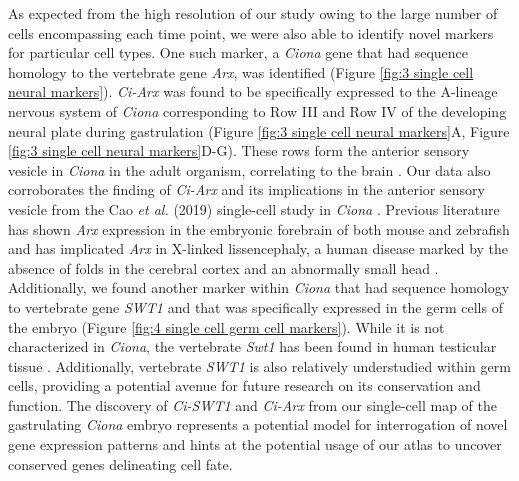 As expected from the high resolution of our study owing to the large number of cells encompassing each time point, we were also able to identify novel markers for particular cell types. One such marker, a \textit{Ciona} gene that had sequence homology to the vertebrate gene \textit{Arx}, was identified (Figure \ref{fig:3 single cell neural markers}). \textit{Ci-Arx} was found to be specifically expressed to the A-lineage nervous system of \textit{Ciona} corresponding to Row III and Row IV of the developing neural plate during gastrulation (Figure \ref{fig:3 single cell neural markers}A, Figure \ref{fig:3 single cell neural markers}D-G). These rows form the anterior sensory vesicle in \textit{Ciona} in the adult organism, correlating to the brain \cite{satoh2014}. Our data also corroborates the finding of \textit{Ci-Arx} and its implications in the anterior sensory vesicle from the Cao \textit{et al.} (2019) single-cell study in \textit{Ciona} \cite{cao2019}. Previous literature has shown \textit{Arx} expression in the embryonic forebrain of both mouse and zebrafish and has implicated \textit{Arx} in X-linked lissencephaly, a human disease marked by the absence of folds in the cerebral cortex and an abnormally small head \cite{miura1997,miura1997,kitamura2002,lim2019,fulp2008}. Additionally, we found another marker within \textit{Ciona} that had sequence homology to vertebrate gene \textit{SWT1} and that was specifically expressed in the germ cells of the embryo (Figure \ref{fig:4 single cell germ cell markers}). While it is not characterized in \textit{Ciona}, the vertebrate \textit{Swt1} has been found in human testicular tissue \cite{fagerberg2014}. Additionally, vertebrate \textit{SWT1} is also relatively understudied within germ cells, providing a potential avenue for future research on its conservation and function. The discovery of \textit{Ci-SWT1} and \textit{Ci-Arx} from our single-cell map of the gastrulating \textit{Ciona} embryo represents a potential model for interrogation of novel gene expression patterns and hints at the potential usage of our atlas to uncover conserved genes delineating cell fate.

